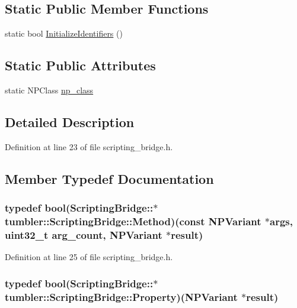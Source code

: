 \subsection*{Static Public Member Functions}
\begin{DoxyCompactItemize}
\item 
static bool \hyperlink{classtumbler_1_1_scripting_bridge_a9653f59bae05d24f2f319a2764a7ce61}{InitializeIdentifiers} ()
\end{DoxyCompactItemize}
\subsection*{Static Public Attributes}
\begin{DoxyCompactItemize}
\item 
static NPClass \hyperlink{classtumbler_1_1_scripting_bridge_a4cd00d35febde2739ee85287f39981ac}{np\_\-class}
\end{DoxyCompactItemize}


\subsection{Detailed Description}


Definition at line 23 of file scripting\_\-bridge.h.



\subsection{Member Typedef Documentation}
\hypertarget{classtumbler_1_1_scripting_bridge_addb1badb0e891b38c6d90767342b5bb3}{
\subsubsection[{Method}]{\setlength{\rightskip}{0pt plus 5cm}typedef bool(ScriptingBridge::$\ast$ {\bf tumbler::ScriptingBridge::Method})(const NPVariant $\ast$args, uint32\_\-t arg\_\-count, NPVariant $\ast$result)}}
\label{classtumbler_1_1_scripting_bridge_addb1badb0e891b38c6d90767342b5bb3}


Definition at line 25 of file scripting\_\-bridge.h.

\hypertarget{classtumbler_1_1_scripting_bridge_ad7507ce0e5c8f49fde790c743447f3c3}{
\subsubsection[{Property}]{\setlength{\rightskip}{0pt plus 5cm}typedef bool(ScriptingBridge::$\ast$ {\bf tumbler::ScriptingBridge::Property})(NPVariant $\ast$result)}}
\label{classtumbler_1_1_scripting_bridge_ad7507ce0e5c8f49fde790c743447f3c3}


